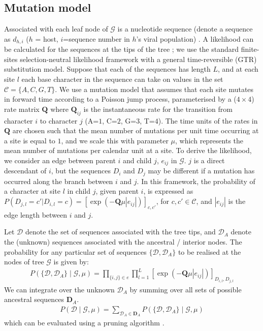 \documentclass[]{report}
\begin{document}
\subsection{Mutation model}
Associated with each leaf node of $\mathcal{G}$ is a nucleotide sequence (denote a sequence as $d_{h,i}$ ($h$ = host, $i$=sequence number in $h$'s viral population) . A likelihood can be calculated for the sequences at the tips of the tree ; we use the standard finite-sites selection-neutral likelihood framework with a general time-reversible (GTR) substitution model. Suppose that each of the sequences has length $L$, and at each site $l$ each base character in the sequence can take on values in the set $\mathcal{C}=\{A,C,G,T\}$. We use a mutation model that assumes that each site mutates in forward time according to a Poisson jump process, parameterised by a ($4 \times 4$) rate matrix $\mathbf{Q}$ where $\mathbf{Q}_{ij}$ is the instantaneous rate for the transition from character $i$ to character $j$ (A=$1$, C=$2$, G=$3$, T=$4$). The time units of the rates in $\mathbf{Q}$ are chosen such that the mean number of mutations per unit time occurring at a site is equal to $1$, and we scale this with parameter $\mu$, which represents the mean number of mutations per calendar unit at a site. 
To derive the likelihood, we consider an edge between parent $i$ and child $j$, $e_{ij}$ in $\mathcal{G}$. $j$ is a direct descendant of $i$, but the sequences $D_i$ and $D_j$ may be different if a mutation has occurred along the branch between $i$ and $j$. In this framework, the probability of a character at site $l$ in child $j$, given parent $i$, is expressed as $P(D_{j,l} = c' | D_{i,l} = c)=[\exp(-\mathbf{Q}\mu|e_{ij}|)]_{c,c'}$, for $c,c' \in \mathcal{C}$, and $|e_{ij}|$ is the edge length between $i$ and $j$. 

Let $\mathcal{D}$ denote the set of sequences associated with the tree tips, and $\mathcal{D}_A$ denote the (unknown) sequences associated with the ancestral / interior nodes. The probability for any particular set of sequences $\{\mathcal{D}, \mathcal{D}_A\}$ to be realised at the nodes of tree $\mathcal{G}$ is given by:
\begin{eqnarray}
P(\{\mathcal{D}, \mathcal{D}_A\}\mid \mathcal{G},\mu)=\prod_{\{i,j\}\in e} \prod_{l=1}^L [\exp(-\mathbf{Q}\mu|e_{ij}|)]_{D_{i,l},D_{j,l}}\label{eq:mut1}
\end{eqnarray}
We can integrate over the unknown $\mathcal{D}_A$ by summing over all sets of possible ancestral sequences $\mathbf{D}_A$.
\begin{eqnarray}
P(\mathcal{D}\mid \mathcal{G},\mu)=\sum_{\mathcal{D}_A \in \mathbf{D}_A} P(\{\mathcal{D}, \mathcal{D}_A\}\mid \mathcal{G},\mu)\label{eq:mut2}
\end{eqnarray}
which can be evaluated using a pruning algorithm \cite{felsenstein:1981}. 
\end{document}
